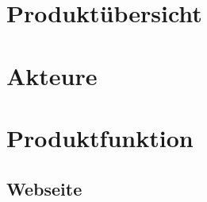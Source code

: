 \documentclass[10pt,a4paper]{article}
\begin{document}



\section{Produkt\"ubersicht}

\section{Akteure}

\section{Produktfunktion}
\subsection{Webseite}
\end{document}

